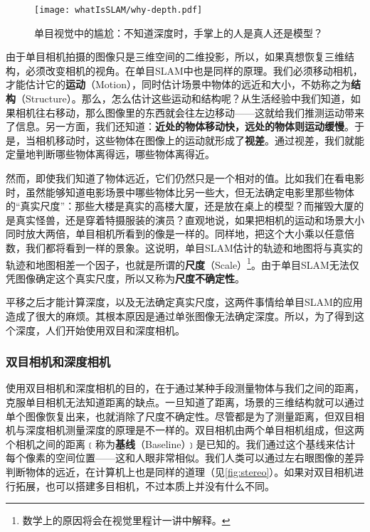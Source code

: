 \begin{figure}[!htp]
	\centering
	\texttt{[image: whatIsSLAM/why-depth.pdf]}
	\caption{单目视觉中的尴尬：不知道深度时，手掌上的人是真人还是模型？}
	\label{fig:why-depth}
\end{figure}

由于单目相机拍摄的图像只是三维空间的二维投影，所以，如果真想恢复三维结构，必须改变相机的视角。在单目SLAM中也是同样的原理。我们必须移动相机，才能估计它的\textbf{运动}（Motion），同时估计场景中物体的远近和大小，不妨称之为\textbf{结构}（Structure）。那么，怎么估计这些运动和结构呢？从生活经验中我们知道，如果相机往右移动，那么图像里的东西就会往左边移动——这就给我们推测运动带来了信息。另一方面，我们还知道：\textbf{近处的物体移动快，远处的物体则运动缓慢}。于是，当相机移动时，这些物体在图像上的运动就形成了\textbf{视差}。通过视差，我们就能定量地判断哪些物体离得远，哪些物体离得近。

然而，即使我们知道了物体远近，它们仍然只是一个相对的值。比如我们在看电影时，虽然能够知道电影场景中哪些物体比另一些大，但无法确定电影里那些物体的“真实尺度”：那些大楼是真实的高楼大厦，还是放在桌上的模型？而摧毁大厦的是真实怪兽，还是穿着特摄服装的演员？直观地说，如果把相机的运动和场景大小同时放大两倍，单目相机所看到的像是一样的。同样地，把这个大小乘以任意倍数，我们都将看到一样的景象。这说明，单目SLAM估计的轨迹和地图将与真实的轨迹和地图相差一个因子，也就是所谓的\textbf{尺度}（Scale）\footnote{数学上的原因将会在视觉里程计一讲中解释。}。由于单目SLAM无法仅凭图像确定这个真实尺度，所以又称为\textbf{尺度不确定性}。

平移之后才能计算深度，以及无法确定真实尺度，这两件事情给单目SLAM的应用造成了很大的麻烦。其根本原因是通过单张图像无法确定深度。所以，为了得到这个深度，人们开始使用双目和深度相机。

\subsubsection{双目相机和深度相机}

使用双目相机和深度相机的目的，在于通过某种手段测量物体与我们之间的距离，克服单目相机无法知道距离的缺点。一旦知道了距离，场景的三维结构就可以通过单个图像恢复出来，也就消除了尺度不确定性。尽管都是为了测量距离，但双目相机与深度相机测量深度的原理是不一样的。双目相机由两个单目相机组成，但这两个相机之间的距离﹝称为\textbf{基线}（Baseline）﹞是已知的。我们通过这个基线来估计每个像素的空间位置——这和人眼非常相似。我们人类可以通过左右眼图像的差异判断物体的远近，在计算机上也是同样的道理（见\autoref{fig:stereo}）。如果对双目相机进行拓展，也可以搭建多目相机，不过本质上并没有什么不同。

